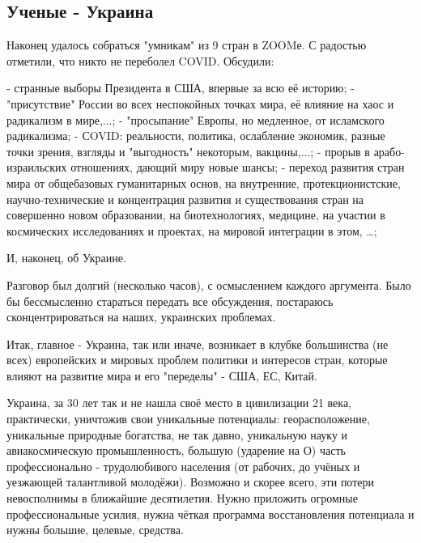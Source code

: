  
 
 

\subsection{Ученые - Украина}
\label{sec:21_10_2020.fb.david_statnikov.1.science_ukraine}

Наконец удалось собраться "умникам" из 9 стран в ZOOMе. 
С радостью отметили, что никто не переболел COVID.
Обсудили:

- странные выборы Президента в США, впервые за всю её историю;
-"присутствие" России во всех неспокойных точках мира, её влияние на хаос и радикализм в мире,...;
- "просыпание" Европы, но медленное, от исламского радикализма;
- СOVID: реальности, политика, ослабление экономик, разные точки зрения, взгляды и "выгодность" некоторым, вакцины,...;
- прорыв в арабо-израильских отношениях, дающий миру новые шансы;
- переход развития стран мира от общебазовых гуманитарных основ, на внутренние,
протекционистские, научно-технические и концентрация развития и  существования
стран на совершенно новом образовании, на биотехнологиях, медицине, на участии
в космических исследованиях и проектах, на мировой интеграции в этом, …;

И, наконец, об Украине.

Разговор был долгий (несколько часов), с осмыслением каждого аргумента. Было бы
бессмысленно стараться передать все обсуждения, постараюсь сконцентрироваться
на наших, украинских проблемах.

Итак, главное - Украина, так или иначе, возникает в клубке большинства (не
всех) европейских и мировых проблем политики и интересов стран, которые влияют
на развитие мира и его "переделы" - США, ЕС, Китай.

Украина, за 30 лет так и не нашла своё место в цивилизации 21 века,
практически, уничтожив свои уникальные потенциалы: георасположение, уникальные
природные богатства, не так давно, уникальную науку и авиакосмическую
промышленность, большую (ударение на О) часть профессионально - трудолюбивого
населения (от рабочих, до учёных и уезжающей талантливой молодёжи).  Возможно и
скорее всего, эти потери невосполнимы в ближайшие десятилетия. Нужно приложить
огромные профессиональные усилия, нужна чёткая программа восстановления
потенциала и нужны большие, целевые, средства.

